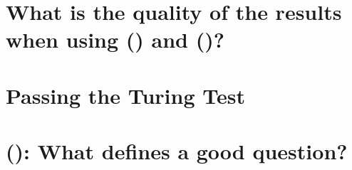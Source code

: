 
\section{What is the quality of the results when using  () and  ()?}
\label{chapter3:quality_results_hmm_bn}


\section{Passing the Turing Test}
\label{chapter3:turing_test}


\section{ (): What defines a good question?}
\label{chapter3:define_good_question}

